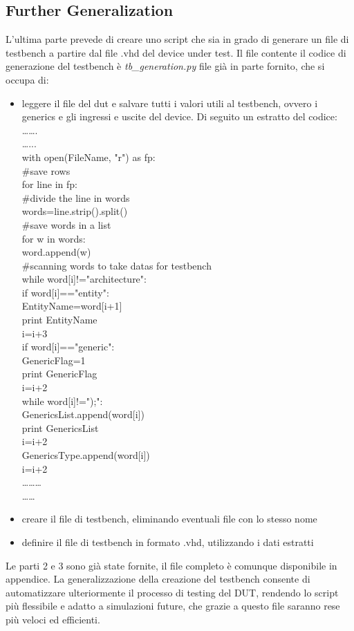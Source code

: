 \subsection{Further Generalization}
L’ultima parte prevede di creare uno script che sia in grado di generare un file di testbench a partire dal file .vhd del device under test. Il file contente il codice di generazione del testbench è \textit{tb\_generation.py} file già in parte fornito, che si occupa di:
\begin{itemize}
	\item{leggere il file del dut e salvare tutti i valori utili al testbench, ovvero i generics e gli ingressi e uscite del device. Di seguito un estratto del codice:\\
	…….\\
	…...\\    
	with open(FileName, "r") as fp:\\
	\#save rows\\
	for line in fp:\\
	\#divide the line in words\\
	words=line.strip().split()\\
	\#save words in a list\\
	for w in words:\\
	word.append(w)\\
	\#scanning words to take datas for testbench\\
	while word[i]!="architecture":\\
	if word[i]=="entity":\\
	EntityName=word[i+1]\\
	print EntityName\\
	i=i+3\\
	if word[i]=="generic":\\
	GenericFlag=1\\
	print GenericFlag\\
	i=i+2\\
	while word[i]!=");":\\
	GenericsList.append(word[i])\\
	print GenericsList\\
	i=i+2\\
	GenericsType.append(word[i])\\
	i=i+2\\
	………\\
	……\\}
	\item{creare il file di testbench, eliminando eventuali file con lo stesso nome}
	\item{definire il file di testbench in formato .vhd, utilizzando i dati estratti}
\end{itemize}
Le parti 2 e 3 sono già state fornite, il file completo è comunque disponibile in appendice.
La generalizzazione della creazione del testbench consente di automatizzare ulteriormente il processo di testing del DUT, rendendo lo script più flessibile e adatto a simulazioni future, che grazie a questo file saranno rese più veloci ed efficienti.\\



